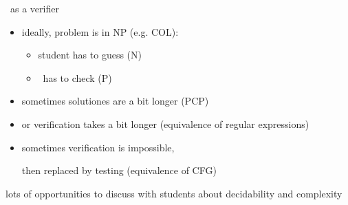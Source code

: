 \begin{slide}{\autotool\ as a verifier}

\begin{itemize}
\item
  ideally, problem is in NP (e.g. COL):
  \begin{itemize}
  \item
    student has to guess (N)
  \item
    \autotool\ has to check (P)
  \end{itemize}
\item
  sometimes solutiones are a bit longer (PCP)
\item
  or verification takes a bit longer 
  (equivalence of regular expressions)
\item
  sometimes verification is impossible,

  then replaced by testing (equivalence of CFG)
\end{itemize}

lots of opportunities to discuss with students
about decidability and complexity
\end{slide}
